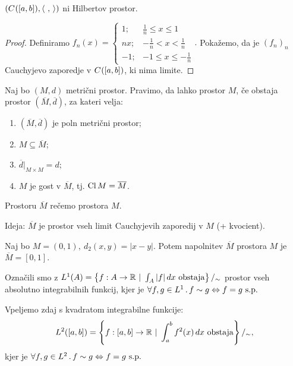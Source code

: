 \begin{trditev}
    \((C^{}([a,b]), \left\langle \ , \,  \right\rangle)\) ni Hilbertov prostor.
\end{trditev}

\begin{proof}
    Definiramo \(f_n(x) = \begin{cases}
        1; &\frac{1}{n} \leq x \leq 1 \\
        nx; &-\frac{1}{n} < x < \frac{1}{n} \\
        -1; &-1 \leq x \leq -\frac{1}{n}
    \end{cases}.\) Pokažemo, da je \((f_n)_n\) Cauchyjevo zaporedje v \(C^{}([a,b])\), ki nima limite.
\end{proof}

\begin{definicija}
    Naj bo \((M, d)\) metrični prostor. Pravimo, da lahko  prostor \(M\), če obstaja prostor \((\overline{M}, \overline{d})\), za kateri velja:
    \begin{enumerate}
        \item \((\overline{M}, \overline{d})\) je poln metrični prostor;
        \item \(M \subseteq \overline{M}\);
        \item \(\overline{d}|_{M \times M} = d\);
        \item \(M\) je gost v \(\overline{M}\), tj. \(\operatorname{Cl} M = \overline{M}\).
    \end{enumerate}
    Prostoru \(\overline{M}\) rečemo  prostora \(M\).
\end{definicija}

\begin{opomba}
    Ideja: \(\overline{M}\) je prostor vseh limit Cauchyjevih zaporedij v \(M\) (+ kvocient).
\end{opomba}

\begin{primer}
    Naj bo \(M = (0,1), \ d_2(x,y) = |x-y|\). Potem napolnitev \(\overline{M}\) prostora \(M\) je \(\overline{M} = [0, 1]\).
\end{primer}

\begin{opomba}
    Označili smo z \(L^1(A) = \left\{f: A \to \mathbb{R} \ | \ \int_{A} |f| \, dx \ \text{obstaja}\right\} /_\sim\) prostor vseh absolutno integrabilnih funkcij, kjer je  \(\all{f, g \in L^1} f \sim g \liff f = g \ \text{s.p.}\)
\end{opomba}

Vpeljemo zdaj s kvadratom integrabilne funkcije: 
\[L^2([a, b]) = \left\{f: [a,b] \to \mathbb{R} \ | \ \int_{a}^{b} f^2(x) \, dx \ \text{obstaja}\right\}/_\sim,\]
kjer je \(\all{f, g \in L^2} f \sim g \liff f = g \ \text{s.p.}\)

